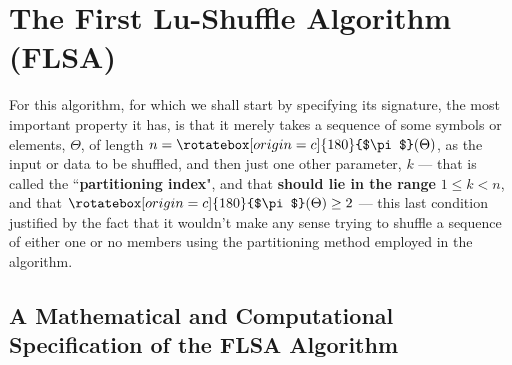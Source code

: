 \documentclass[a4paper, 18pt]{book} %
\newcommand{\invpi}{\rotatebox[origin=c]{180}{$\pi$}}
\begin{document}
\section{The First Lu-Shuffle Algorithm (FLSA)}

For this algorithm, for which we shall start by specifying its signature, the most important property it has, is that it merely takes a sequence of some symbols or elements, $\Theta$, of length $n = \invpi(\Theta)$, as the input or data to be shuffled, and then just one other parameter, $k$ --- that is called the ``\textbf{partitioning index}", and that \textbf{should lie in the range} $1 \leq k < n$, and that $\invpi(\Theta) \geq 2$ --- this last condition justified by the fact that it wouldn't make any sense trying to shuffle a sequence of either one or no members using the partitioning method employed in the algorithm.


\subsection{A Mathematical and Computational Specification of the FLSA Algorithm}
\end{document}
